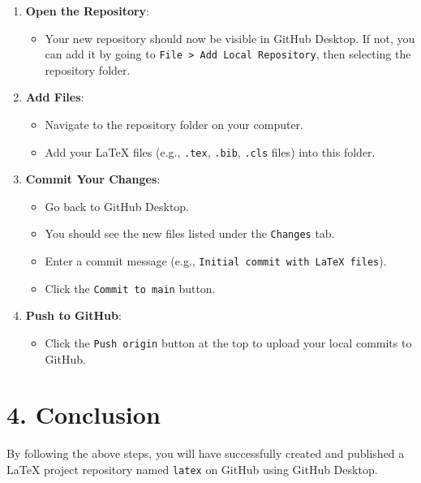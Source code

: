 \documentclass[12pt, a4paper]{article}
\begin{document}
\begin{enumerate}
    \item \textbf{Open the Repository}:
    \begin{itemize}
        \item \textmd{Your new repository should now be visible in GitHub Desktop. If not, you can add it by going to \texttt{File > Add Local Repository}, then selecting the repository folder.}
    \end{itemize}
\vspace{0.3cm}
    \item \textbf{Add Files}:
    \begin{itemize}
        \item \textmd{Navigate to the repository folder on your computer.}
        \item \textmd{Add your LaTeX files (e.g., \texttt{.tex}, \texttt{.bib}, \texttt{.cls} files) into this folder.}
    \end{itemize}
\vspace{0.3cm}  
    \item \textbf{Commit Your Changes}:
    \begin{itemize}
        \item \textmd{Go back to GitHub Desktop.}
        \item \textmd{You should see the new files listed under the \texttt{Changes} tab.}
        \item \textmd{Enter a commit message (e.g., \texttt{Initial commit with LaTeX files}).}
        \item \textmd{Click the \texttt{Commit to main} button.}
    \end{itemize}
\vspace{0.3cm}
    \item \textbf{Push to GitHub}:
    \begin{itemize}
        \item \textmd{Click the \texttt{Push origin} button at the top to upload your local commits to GitHub.}
    \end{itemize}
\end{enumerate}
\vspace{0.6cm}
\section*{\textcolor{blue!60}{4. Conclusion}}
By following the above steps, you will have successfully created and published a LaTeX project repository named \texttt{latex} on GitHub using GitHub Desktop.
\end{document}
